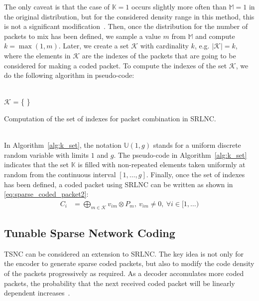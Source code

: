 The only caveat is that the case of $\mathbb{K} = 1$ occurs slightly
more often than $\mathbb{M} = 1$ in the original distribution, but for
the considered density range in this method, this is not a significant
modification~\cite{practicalview_tsnc2015}. Then, once the
distribution for the number of packets to mix has been defined, we
sample a value $m$ from $\mathbb{M}$ and compute $k =
\max(1,m)$. Later, we create a set $\mathcal{K}$ with
cardinality $k$, e.g. $|\mathcal{K}| = k$, where the elements in
$\mathcal{K}$ are the indexes of the packets that are going to be
considered for making a coded packet. To compute the indexes
of the set $\mathcal{K}$, we do the following algorithm in pseudo-code: \\
\ \\
\begin{algorithm}[H]
 \label{alg:k_set}
 $\mathcal{K}$ = \{ \}\;
 \caption{Computation of the set of indexes for packet combination in SRLNC.}
\end{algorithm}
\ \\
In Algorithm~\ref{alg:k_set}, the notation $\mathbb{U}(1,g)$ stands
for a uniform discrete random variable with limits $1$ and $g$. The
pseudo-code in Algorithm~\ref{alg:k_set} indicates that the set $\mathbb{K}$
is filled with non-repeated elements taken uniformly at random from
the continuous interval $[1,\ldots,g]$. Finally, once the set of indexes has been
defined, a coded packet using \ac{SRLNC} can be written as shown in
\eqref{eq:sparse_coded_packet2}:
%
\begin{align} \label{eq:sparse_coded_packet2}
    C_i  &= \bigoplus_{m \in \mathcal{K}} v_{im} \otimes P_{m},\ v_{im} \neq 0,\ \forall i \in [1,\ldots)
\end{align}

\subsection{Tunable Sparse Network Coding}

\ac{TSNC} can be considered an extension to \ac{SRLNC}. The key idea is
not only for the encoder to generate sparse coded packets, but also to
modify the code density of the packets progressively as required. As a
decoder accomulates more coded packets, the probability that the next
received coded packet will be linearly dependent increases~\cite{Feizi2012}.

